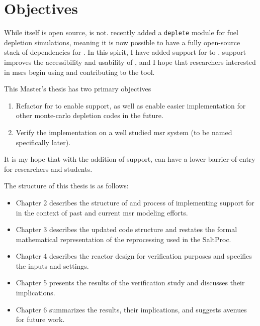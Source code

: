 \section{Objectives}%
\label{sec:objectives}

While \SaltProc itself is open source, \SerpentTWO is not. \OpenMC recently
added a \verb.deplete. module for fuel depletion simulations, meaning it is now
possible to have a fully open-source stack of dependencies for \SaltProc.
In this spirit, I have added support for \OpenMC to \SaltProc. \OpenMC support improves
the accessibility and usability of \SaltProc, and I hope that researchers
interested in \Gls{msr}s begin using and contributing to the tool.

This Master's thesis has two primary objectives
\begin{enumerate}
    \item Refactor \SaltProc for to enable \OpenMC support, as well as enable easier implementation for other monte-carlo depletion codes in the future. 
    \item Verify the implementation on a well studied \Gls{msr} system (to be
        named specifically later).
\end{enumerate}

It is my hope that with the addition of \OpenMC support, \SaltProc can have a lower
barrier-of-entry for researchers and students. 

The structure of this thesis is as follows:
\begin{itemize}
    \item Chapter 2 describes the structure of \SaltProc and process of implementing support for \OpenMC in the context of past and current \Gls{msr} modeling efforts.
    \item Chapter 3 describes the updated code structure and restates the formal mathematical representation of the reprocessing used in the SaltProc.
    \item Chapter 4 describes the reactor design for verification purposes and specifies the inputs and settings.
    \item Chapter 5 presents the results of the verification study and discusses their implications.
    \item Chapter 6 summarizes the results, their implications, and suggests avenues for future work.
\end{itemize}

